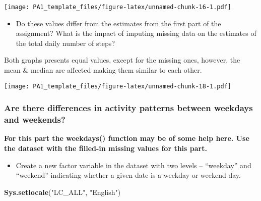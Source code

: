 \documentclass[
]{article}
\newenvironment{Shaded}{\begin{snugshade}}{\end{snugshade}}
\newcommand{\DataTypeTok}[1]{\textcolor[rgb]{0.13,0.29,0.53}{#1}}
\newcommand{\KeywordTok}[1]{\textcolor[rgb]{0.13,0.29,0.53}{\textbf{#1}}}
\newcommand{\NormalTok}[1]{#1}
\newcommand{\OperatorTok}[1]{\textcolor[rgb]{0.81,0.36,0.00}{\textbf{#1}}}
\newcommand{\StringTok}[1]{\textcolor[rgb]{0.31,0.60,0.02}{#1}}
\providecommand{\tightlist}{%
  \setlength{\itemsep}{0pt}\setlength{\parskip}{0pt}}
\begin{document}
\begin{Shaded}
\end{Shaded}

\texttt{[image: PA1\_template\_files/figure-latex/unnamed-chunk-16-1.pdf]}

\begin{itemize}
\tightlist
\item
  Do these values differ from the estimates from the first part of the
  assignment? What is the impact of imputing missing data on the
  estimates of the total daily number of steps?
\end{itemize}

Both graphs presents equal values, except for the missing ones, however,
the mean \& median are affected making them similar to each other.

\texttt{[image: PA1\_template\_files/figure-latex/unnamed-chunk-18-1.pdf]}

\hypertarget{are-there-differences-in-activity-patterns-between-weekdays-and-weekends}{%
\subsubsection{Are there differences in activity patterns between
weekdays and
weekends?}\label{are-there-differences-in-activity-patterns-between-weekdays-and-weekends}}

\textbf{For this part the \color{red}{\verb|weekdays()|}weekdays()
function may be of some help here. Use the dataset with the filled-in
missing values for this part.}

\begin{itemize}
\tightlist
\item
  Create a new factor variable in the dataset with two levels --
  ``weekday'' and ``weekend'' indicating whether a given date is a
  weekday or weekend day.
\end{itemize}

\begin{Shaded}
\begin{Highlighting}[]
\KeywordTok{Sys.setlocale}\NormalTok{(}\StringTok{"LC_ALL"}\NormalTok{, }\StringTok{"English"}\NormalTok{)}
\end{Highlighting}
\end{Shaded}
\end{document}

